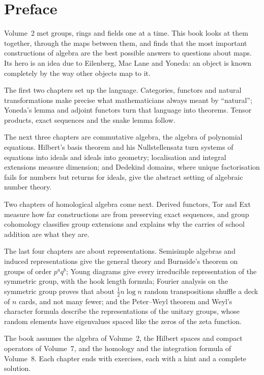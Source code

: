 \chapter*{Preface}
Volume~2 met groups, rings and fields one at a time. This book looks at them together, through the maps between them, and finds that
the most important constructions of algebra are the best possible answers to questions about maps. Its hero is an idea due to
Eilenberg, Mac Lane and Yoneda: an object is known completely by the way other objects map to it.

The first two chapters set up the language. Categories, functors and natural transformations make precise what mathematicians always
meant by ``natural''; Yoneda's lemma and adjoint functors turn that language into theorems. Tensor products, exact sequences and
the snake lemma follow.

The next three chapters are commutative algebra, the algebra of polynomial equations. Hilbert's basis theorem and his
Nullstellensatz turn systems of equations into ideals and ideals into geometry; localisation and integral extensions measure
dimension; and Dedekind domains, where unique factorisation fails for numbers but returns for ideals, give the abstract setting of
algebraic number theory.

Two chapters of homological algebra come next. Derived functors, Tor and Ext measure how far constructions are from preserving exact
sequences, and group cohomology classifies group extensions and explains why the carries of school addition are what they are.

The last four chapters are about representations. Semisimple algebras and induced representations give the general theory and
Burnside's theorem on groups of order $p^aq^b$; Young diagrams give every irreducible representation of the symmetric group, with the
hook length formula; Fourier analysis on the symmetric group proves that about $\frac12n\log n$ random transpositions shuffle a deck
of $n$ cards, and not many fewer; and the Peter--Weyl theorem and Weyl's character formula describe the representations of the
unitary groups, whose random elements have eigenvalues spaced like the zeros of the zeta function.

The book assumes the algebra of Volume~2, the Hilbert spaces and compact operators of Volume~7, and the homology and the integration
formula of Volume~8. Each chapter ends with exercises, each with a hint and a complete solution.
